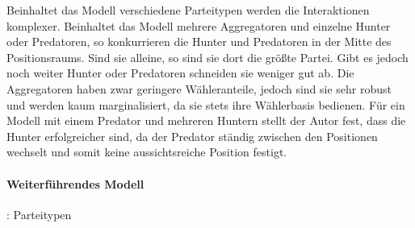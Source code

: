 Beinhaltet das Modell verschiedene Parteitypen werden die Interaktionen komplexer. Beinhaltet das Modell mehrere Aggregatoren und einzelne Hunter oder Predatoren, so konkurrieren die Hunter und Predatoren in der Mitte des Positionsraums. Sind sie alleine, so sind sie dort die größte Partei. Gibt es jedoch noch weiter Hunter oder Predatoren schneiden sie weniger gut ab. Die Aggregatoren haben zwar geringere Wähleranteile, jedoch sind sie sehr robust und werden kaum marginalisiert, da sie stets ihre Wählerbasis bedienen.
Für ein Modell mit einem Predator und mehreren Huntern stellt der Autor fest, dass die Hunter erfolgreicher sind, da der Predator ständig zwischen den Positionen wechselt und somit keine aussichtsreiche Position festigt. \citep[S.\,271-4]{laver2005policy}

\paragraph{Weiterführendes Modell}
\citet{laver2007endogenousParties}: Parteitypen %
